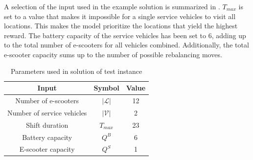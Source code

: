 A selection of the input used in the example solution is summarized in . $T_{max}$ is set to a value that makes it impossible for a single service vehicles to visit all locations. This makes the model prioritize the locations that yield the highest reward. The battery capacity of the service vehicles has been set to 6, adding up to the total number of e-scooters for all vehicles combined. Additionally, the total e-scooter capacity sums up to the number of possible rebalancing moves. 
\\
\begingroup
    \setlength{\tabcolsep}{10pt} %
    \renewcommand{\arraystretch}{1.9} %
    \begin{table}[h]
        \centering
        \caption{Parameters used in solution of test instance}
        \begin{tabular}{c|c|c}
            
             \textbf{Input} & \textbf{Symbol} & \textbf{Value}   \\
             \hline
             Number of e-scooters & $|\mathcal{L}|$ & 12\\
             \hline
             Number of service vehicles & $|\mathcal{V}|$ & 2\\
             \hline
             Shift duration & $T_{max}$ & 23\\
             \hline
             Battery capacity & $Q^B$ & 6\\
             \hline
             E-scooter capacity & $Q^S$ & 1\\
             
        \end{tabular}
        \label{tab:param_example_solution}
    \end{table}
\endgroup

